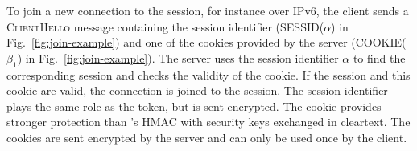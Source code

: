 To join a new \tcp connection to the \tcpls session, for instance over IPv6, the
client sends a \textsc{ClientHello} message containing the session identifier
(SESSID($\alpha$) in Fig.~\ref{fig:join-example}) and one of the cookies
provided by the server (COOKIE($\beta_1$) in Fig.~\ref{fig:join-example}). The
server uses the session identifier $\alpha$ to find the corresponding \tcpls
session and checks the validity of the cookie. If the \tcpls session and this 
cookie
are valid, the \tcp connection is joined to the \tcpls session. The session
identifier plays the same role as the \mptcp token, but is sent encrypted. The
cookie provides stronger protection than \mptcp's HMAC with security keys
exchanged in cleartext. The \tcpls cookies are sent encrypted by the server and
can only be used once by the client.



